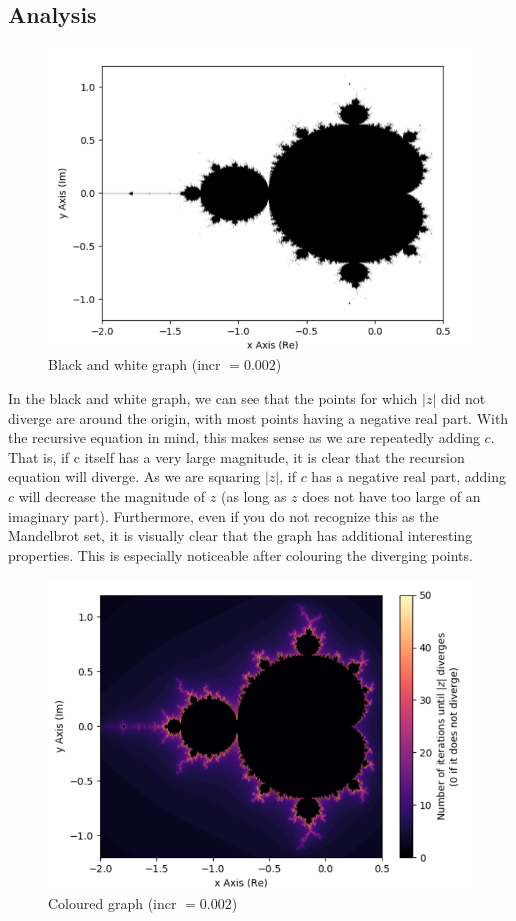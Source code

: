 \documentclass{article}
\begin{document}
\newpage
\subsection*{Analysis}

\begin{figure}[h]
  \centering
\includegraphics[scale=0.5]{Black and White}
\caption{Black and white graph (incr $ = 0.002$)}
\end{figure}

In the black and white graph, we can see that the points for which $\left| z
\right|$ did not diverge are around the origin, with most points having a negative
real part. With the recursive equation in mind, this makes sense as we are
repeatedly adding $c$. That is, if c itself has a very large magnitude, it is
clear that the recursion equation will diverge. As we are squaring $\left| z
\right|$, if $c$ has a negative real part, adding $c$ will decrease the magnitude of $z$
(as long as $z$ does not have too large of an imaginary part). Furthermore, even if you do not recognize this as the Mandelbrot set, it is visually clear that the graph has additional interesting properties. This is especially noticeable after colouring the diverging points.

\begin{figure}[h]
  \centering
\includegraphics[scale=0.5]{Coloured}
\caption{Coloured graph (incr $ = 0.002$)}
\end{figure}
\end{document}
